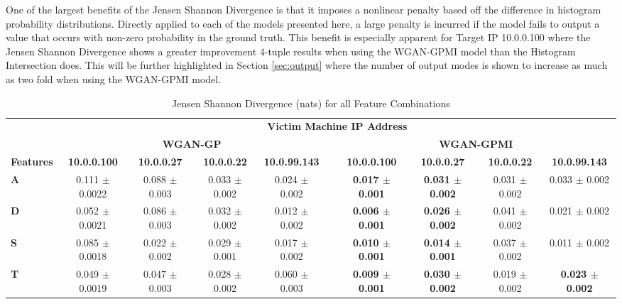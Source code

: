 One of the largest benefits of the Jensen Shannon Divergence is that it imposes a nonlinear penalty based off the difference in histogram probability distributions. Directly applied to each of the models presented here, a large penalty is incurred if the model fails to output a value that occurs with non-zero probability in the ground truth. This benefit is especially apparent for Target IP 10.0.0.100 where the Jensen Shannon Divergence shows a greater improvement 4-tuple results when using the WGAN-GPMI model than the Histogram Intersection does. This will be further highlighted in Section \ref{sec:output} where the number of output modes is shown to increase as much as two fold when using the WGAN-GPMI model. 

\begin{table}[!htbp]
	\caption{Jensen Shannon Divergence (nats) for all Feature Combinations}
	\label{tab:jsd}
	\centering
	\small
	\begin{adjustbox}{angle=90}
		\begin{tabular}{l|c|c|c|c|c|c|c|c|c|}
			\multicolumn{1}{c|}{} & \multicolumn{9}{c|}{\textbf{Victim Machine IP Address}} \\
			\multicolumn{1}{c|}{} & \multicolumn{4}{c|}{\textbf{WGAN-GP}} &  & \multicolumn{4}{c|}{\textbf{WGAN-GPMI}} \\
			\multicolumn{1}{c|}{\textbf{Features}} & \textbf{10.0.0.100} & \textbf{10.0.0.27} & \textbf{10.0.0.22} & \textbf{10.0.99.143} & \textbf{} & \textbf{10.0.0.100} & \textbf{10.0.0.27} & \textbf{10.0.0.22} & \textbf{10.0.99.143} \\ \hline
			\textbf{A} & 0.111 $\pm$ 0.0022& 0.088 $\pm$ 0.003 & 0.033 $\pm$ 0.002 & 0.024 $\pm$ 0.002 &  & \textbf{0.017 $\pm$ 0.001} & \textbf{0.031 $\pm$ 0.002} & 0.031  $\pm$ 0.002 & 0.033 $\pm$ 0.002 \\
			\textbf{D} & 0.052 $\pm$ 0.0021& 0.086 $\pm$ 0.003 & 0.032 $\pm$ 0.002 & 0.012 $\pm$ 0.002 &  & \textbf{0.006 $\pm$ 0.001} & \textbf{0.026 $\pm$ 0.002} & 0.041  $\pm$ 0.002 & 0.021 $\pm$ 0.002 \\
			\textbf{S} & 0.085 $\pm$ 0.0018& 0.022 $\pm$ 0.002 & 0.029 $\pm$ 0.001 & 0.017 $\pm$ 0.002 &  & \textbf{0.010 $\pm$ 0.001} & \textbf{0.014 $\pm$ 0.001} & 0.037  $\pm$ 0.002 & 0.011 $\pm$ 0.002 \\
			\textbf{T} & 0.049 $\pm$ 0.0019& 0.047 $\pm$ 0.003 & 0.028 $\pm$ 0.002 & 0.060 $\pm$ 0.003 &  & \textbf{0.009 $\pm$ 0.001} & \textbf{0.030 $\pm$ 0.002} & 0.019  $\pm$ 0.002 & \textbf{0.023 $\pm$ 0.002} \\ \hline

\end{tabular}
\end{adjustbox}
\end{table}

